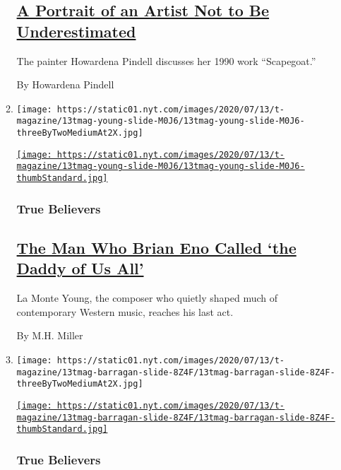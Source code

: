 \begin{enumerate}
\begin{enumerate}
{    \subsection{\texorpdfstring{\href{/2020/07/24/t-magazine/howardena-pindell.html}{A
    Portrait of an Artist Not to Be
    Underestimated}}{A Portrait of an Artist Not to Be Underestimated}}\label{a-portrait-of-an-artist-not-to-be-underestimated}}

    The painter Howardena Pindell discusses her 1990 work ``Scapegoat.''

    By Howardena Pindell
  \item
    \texttt{[image: https://static01.nyt.com/images/2020/07/13/t-magazine/13tmag-young-slide-M0J6/13tmag-young-slide-M0J6-threeByTwoMediumAt2X.jpg]}

    \href{/2020/07/22/t-magazine/la-monte-young.html}{\texttt{[image: https://static01.nyt.com/images/2020/07/13/t-magazine/13tmag-young-slide-M0J6/13tmag-young-slide-M0J6-thumbStandard.jpg]}}

    \hypertarget{true-believers-1}{%
    \subsubsection{True Believers}\label{true-believers-1}}

    \hypertarget{the-man-who-brian-eno-called-the-daddy-of-us-all}{%
    \subsection{\texorpdfstring{\href{/2020/07/22/t-magazine/la-monte-young.html}{The
    Man Who Brian Eno Called `the Daddy of Us
    All'}}{The Man Who Brian Eno Called `the Daddy of Us All'}}\label{the-man-who-brian-eno-called-the-daddy-of-us-all}}

    La Monte Young, the composer who quietly shaped much of contemporary
    Western music, reaches his last act.

    By M.H. Miller
  \item
    \texttt{[image: https://static01.nyt.com/images/2020/07/13/t-magazine/13tmag-barragan-slide-8Z4F/13tmag-barragan-slide-8Z4F-threeByTwoMediumAt2X.jpg]}

    \href{/2020/07/24/t-magazine/luis-barragan.html}{\texttt{[image: https://static01.nyt.com/images/2020/07/13/t-magazine/13tmag-barragan-slide-8Z4F/13tmag-barragan-slide-8Z4F-thumbStandard.jpg]}}

    \hypertarget{true-believers-2}{%
    \subsubsection{True Believers}\label{true-believers-2}}


\end{enumerate}
\end{enumerate}
